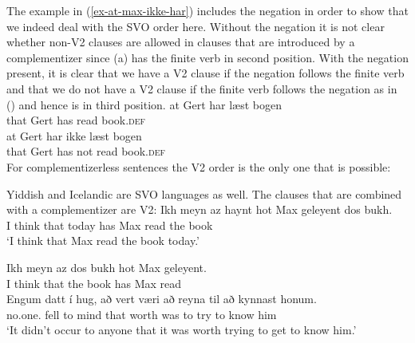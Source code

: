 \eal
{}
\zl
The example in (\ref{ex-at-max-ikke-har}) includes the negation in order to show that we indeed deal
with the SVO order here. Without the negation it is not clear whether non-V2 clauses are allowed in
clauses that are introduced by a complementizer since (a) has the finite verb in second
position. With the negation present, it is clear that we have a V2 clause if the negation follows
the finite verb and that we do not have a V2 clause if the finite verb follows the negation as in
() and hence is in third position.
\eal
\settowidth{}
\ex 
\gll at Gert har læst bogen\\
     that Gert has read book.\textsc{def}\\
\ex 
\gll at Gert har ikke læst bogen\\
     that Gert has not read book.\textsc{def}\\
\zl 
For complementizerless sentences the V2 order is the only one that is possible:
\eal
\settowidth{}
\zl 


Yiddish and Icelandic are SVO languages as well. The clauses that are combined with a
complementizer are V2:
\eal
\ex
\gll Ikh meyn  az   haynt hot Max geleyent dos bukh.\footnotemark\\
     I think that today has Max read the book\\\yiddish
{}
\glt `I think that Max read the book today.'

\ex%
\gll Ikh meyn  az   dos bukh hot Max geleyent.\\
     I think that the book has Max read\\

\zl
\ea 
\gll Engum         datt í hug,  að   vert  væri að reyna til     að kynnast honum.\footnotemark\\
     no.one.\DAT{} fell to mind that worth was  to try   \PREP{} to know    him\\\icelandic
{}
\glt `It didn't occur to anyone that it was worth trying to get to know him.'
\z

